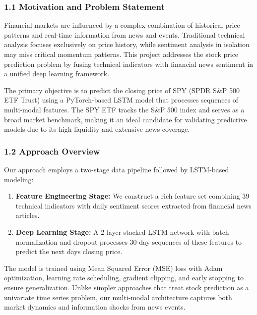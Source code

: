 \documentclass[
]{article}
\begin{document}
\subsubsection{1.1 Motivation and Problem
Statement}\label{11-motivation-and-problem-statement}

Financial markets are influenced by a complex combination of historical
price patterns and real-time information from news and events.
Traditional technical analysis focuses exclusively on price history,
while sentiment analysis in isolation may miss critical momentum
patterns. This project addresses the stock price prediction problem by
fusing technical indicators with financial news sentiment in a unified
deep learning framework.

The primary objective is to predict the closing price of SPY (SPDR S\&P
500 ETF Trust) using a PyTorch-based LSTM model that processes sequences
of multi-modal features. The SPY ETF tracks the S\&P 500 index and
serves as a broad market benchmark, making it an ideal candidate for
validating predictive models due to its high liquidity and extensive
news coverage.

\subsubsection{1.2 Approach Overview}\label{12-approach-overview}

Our approach employs a two-stage data pipeline followed by LSTM-based
modeling:

\begin{enumerate}
\def\labelenumi{\arabic{enumi}.}
\item
  \textbf{Feature Engineering Stage:} We construct a rich feature set
  combining 39 technical indicators with daily sentiment scores
  extracted from financial news articles.
\item
  \textbf{Deep Learning Stage:} A 2-layer stacked LSTM network with
  batch normalization and dropout processes 30-day sequences of these
  features to predict the next day\textquotesingle s closing price.
\end{enumerate}

The model is trained using Mean Squared Error (MSE) loss with Adam
optimization, learning rate scheduling, gradient clipping, and early
stopping to ensure generalization. Unlike simpler approaches that treat
stock prediction as a univariate time series problem, our multi-modal
architecture captures both market dynamics and information shocks from
news events.
\end{document}
